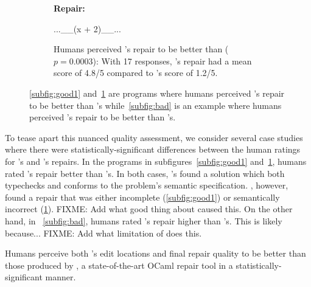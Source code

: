 \begin{figure}
\begin{subfigure}[t]{.28\textwidth}
\begin{center}
\textbf{\seminal Repair:}
\end{center}
\begin{compactcode}
      ...__(x + 2)__...
\end{compactcode}
\caption{Humans perceived \toolname's repair to be
better than \seminal ($p=0.0003$): With 17 responses, \toolname's
repair had a mean score of 4.8/5 compared to \seminal's
score of 1.2/5.}
\label{subfig:good2}
\end{subfigure}
\caption{\ref{subfig:good1} and~\ref{subfig:good2} are programs where
humans perceived \toolname's repair to be better than \seminal's while~\ref{subfig:bad}
is an example where humans perceived \seminal's repair to be better than \toolname's.}
\label{fig:examples}
\end{figure}

To tease apart this nuanced quality assessment, we consider several case studies where
there were statistically-significant differences between the human ratings for
\toolname's and \seminal's repairs. In the programs in subfigures~\ref{subfig:good1}
and~\ref{subfig:good2}, humans rated \toolname's repair better than \seminal's.
In both cases, \toolname's found a solution which both typechecks and
conforms to the problem's semantic specification. \seminal, however, found a
repair that was either incomplete (\ref{subfig:good1}) or semantically incorrect
(\ref{subfig:good2}). FIXME: Add what good thing about \toolname caused this.
On the other hand, in ~\ref{subfig:bad}, humans rated \seminal's repair higher
than \toolname's. This is likely because... FIXME: Add what limitation of \toolname
does this.
\vspace{3mm}
\begin{framed}
\noindent Humans perceive both \toolname's edit locations and final
 repair quality to be better than those produced by \seminal, a state-of-the-art
  OCaml repair tool in a statistically-significant manner.
\end{framed}






